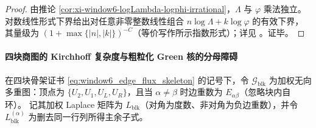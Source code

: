 \begin{proof}
由推论 \ref{cor:xi-window6-logLambda-logphi-irrational}，\(\Lambda\) 与 \(\varphi\) 乘法独立。
对数线性形式下界给出对任意非零整数线性组合 \(n\log\Lambda+k\log\varphi\) 的有效下界，其量级为 \((1+\max\{|n|,|k|\})^{-C}\)（等价写作所示指数形式）；详见 \cite{BakerWustholz2007LogarithmicForms,Matveev2000LinearFormsLogs}。证毕。
\end{proof}

\paragraph{四块商图的 Kirchhoff 复杂度与粗粒化 Green 核的分母障碍}
在四块骨架证书 \eqref{eq:window6_edge_flux_skeleton} 的记号下，令 \(\mathcal{G}_{\mathrm{blk}}\) 为加权无向多重图：顶点为 \(\{U_2,U_1,U_L,U_R\}\)，且当 \(\alpha\neq\beta\) 时边重数为 \(E_{\alpha\beta}\)（忽略块内自环）。
记其加权 Laplace 矩阵为 \(L_{\mathrm{blk}}\)（对角为度数、非对角为负边重数），并令 \(L_{\mathrm{blk}}^{(\alpha)}\) 为删去同一行列所得主余子式。

